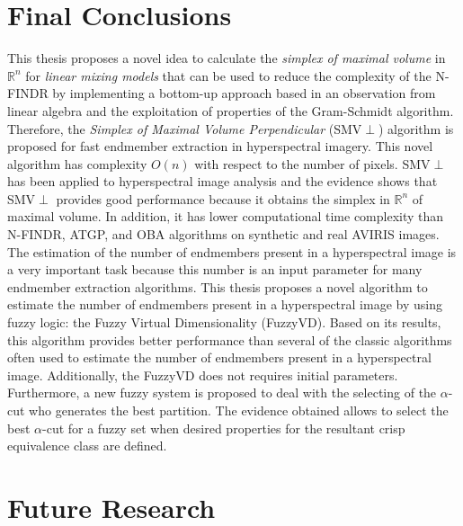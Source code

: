 \documentclass[11pt, oneside]{Thesis} %
\begin{document}


\section{Final Conclusions}

This thesis proposes a novel idea to calculate the \emph{simplex of 
maximal volume} in $\mathbb{R}^n$ for \emph{linear mixing models} 
that can be used to reduce the complexity of the N-FINDR by 
implementing a bottom-up approach based in an observation from linear 
algebra and the exploitation of properties of the Gram-Schmidt 
algorithm. Therefore, the \emph{Simplex of Maximal Volume 
Perpendicular} (SMV$\perp$) algorithm is proposed for fast endmember 
extraction in hyperspectral imagery. This novel algorithm has 
complexity \iffalse$T\left(\left[kN-\frac{k^2-k}{2}\right]5L\right)$,\fi
$O(n)$ with respect to the number of pixels. SMV$\perp$ 
has been applied to hyperspectral image analysis and the evidence 
shows that SMV$\perp$ provides good performance because it obtains 
the simplex in $\mathbb{R}^n$ of maximal volume. In addition, it has 
lower computational time complexity than N-FINDR, ATGP, and OBA 
algorithms on synthetic and real AVIRIS images. \\

The estimation of the number of endmembers present in a hyperspectral 
image is a very important task because this number is an input parameter 
for many endmember extraction algorithms. This thesis proposes a novel 
algorithm to estimate the number of endmembers present in a hyperspectral 
image by using fuzzy logic: the Fuzzy Virtual Dimensionality (FuzzyVD). 
Based on its results, this algorithm provides better performance than 
several of the classic algorithms often used to estimate the number of 
endmembers present in a hyperspectral image. Additionally, the FuzzyVD 
does not requires initial parameters. Furthermore, a new fuzzy system is 
proposed to deal with the selecting of the $\alpha$-cut who generates the 
best partition. The evidence obtained allows to select the best 
$\alpha$-cut for a fuzzy set when desired properties for the 
resultant crisp equivalence class are defined.










\section{Future Research}
\end{document}
